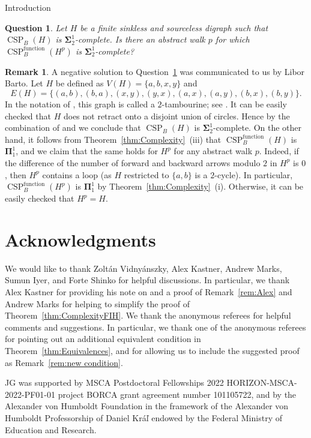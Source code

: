 \documentclass[psamsfonts]{amsart}
\newtheorem{quest}[thm]{Question}
\theoremstyle{definition}
\newtheorem{remark}[thm]{Remark}
\theoremstyle{remark}
\numberwithin{equation}{section}
\newcommand\mbf{\mathbf}
\begin{document}
\begin{section}{Introduction}
    \begin{quest}
    \label{q:LB}
        Let $H$ be a finite sinkless and sourceless digraph such that $\operatorname{CSP}_B(H)$ is $\mbf{\Sigma}^1_2$-complete.
        Is there an abstract walk $p$ for which $\operatorname{CSP}^{\operatorname{function}}_B(H^p)$ is $\mbf{\Sigma}^1_2$-complete?
    \end{quest}

    \begin{remark}
        A negative solution to Question~\ref{q:LB} was communicated to us by Libor Barto.
Let $H$ be defined as $V(H)=\{a,b,x,y\}$ and 
$$E(H)=\{(a,b),(b,a),(x,y),(y,x),(a,x),(a,y),(b,x),(b,y)\}.$$ 
In the notation of \cite{bkn2009}, this graph is called a $2$-tambourine; see \cite[Figure 1.]{bkn2009}.
It can be easily checked that $H$ does not retract onto a disjoint union of circles. Hence by the combination of \cite[Theorems~3.1, 3.2 and 3.3]{bkn2009} and \cite[Corollary~6.3]{thornton2022} we conclude that $\operatorname{CSP}_B(H)$ is $\mbf{\Sigma}^1_2$-complete.
On the other hand, it follows from Theorem~\ref{thm:Complexity}~(iii) that $\operatorname{CSP}^{\operatorname{function}}_B(H)$ is $\mbf{\Pi}^1_1$, and we claim that the same holds for $H^p$ for any abstract walk $p$.
Indeed, if the difference of the number of forward and backward arrows modulo $2$ in $H^p$ is $0$, then $H^p$ contains a loop (as $H$ restricted to $\{a,b\}$ is a $2$-cycle).
In particular, $\operatorname{CSP}^{\operatorname{function}}_B(H^p)$ is $\mbf{\Pi}^1_1$ by Theorem~\ref{thm:Complexity}~(i).
Otherwise, it can be easily checked that $H^p=H$.
    \end{remark}

\end{section}

\section*{Acknowledgments}
We would like to thank Zoltán Vidnyánszky, Alex Kastner, Andrew Marks, Sumun Iyer, and Forte Shinko for helpful discussions. In particular, we thank Alex Kastner for providing his note on \cite{tv2021} and a proof of Remark~\ref{rem:Alex} and Andrew Marks for helping to simplify the proof of Theorem~\ref{thm:ComplexityFIH}.
We thank the anonymous referees for helpful comments and suggestions. In particular, we thank one of the anonymous referees for pointing out an additional equivalent condition in Theorem~\ref{thm:Equivalences}, and for allowing us to include the suggested proof as Remark~\ref{rem:new condition}.

JG was supported by MSCA Postdoctoral Fellowships 2022 HORIZON-MSCA-2022-PF01-01 project BORCA grant agreement number 101105722, and by the Alexander von Humboldt Foundation in the framework of the Alexander von Humboldt Professorship of Daniel Kráľ endowed by the Federal Ministry of Education and Research.




\end{document}
